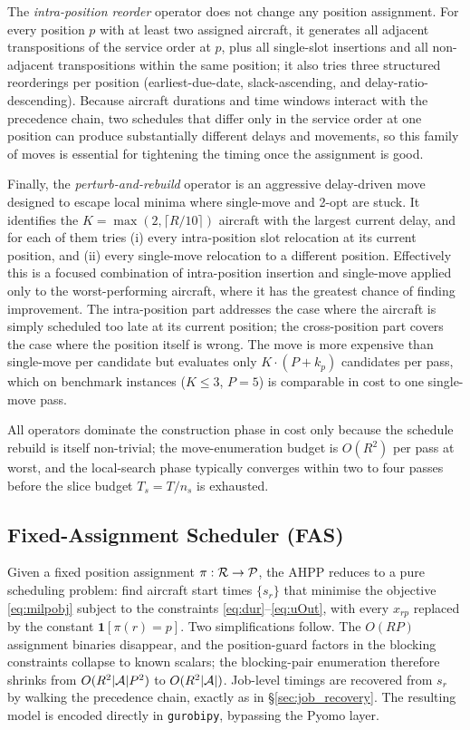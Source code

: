 The \emph{intra-position reorder} operator does not change any
position assignment.  For every position $p$ with at least two
assigned aircraft, it generates all adjacent transpositions of the
service order at $p$, plus all single-slot insertions and all
non-adjacent transpositions within the same position; it also tries
three structured reorderings per position (earliest-due-date,
slack-ascending, and delay-ratio-descending).  Because aircraft
durations and time windows interact with the precedence chain, two
schedules that differ only in the service order at one position
can produce substantially different delays and movements, so this
family of moves is essential for tightening the timing once the
assignment is good.

Finally, the \emph{perturb-and-rebuild} operator is an aggressive
delay-driven move designed to escape local minima where single-move
and 2-opt are stuck.  It identifies the
$K = \max(2, \lceil R/10 \rceil)$ aircraft with the largest current
delay, and for each of them tries (i) every intra-position slot
relocation at its current position, and (ii) every single-move
relocation to a different position.  Effectively this is a focused
combination of intra-position insertion and single-move applied only
to the worst-performing aircraft, where it has the greatest chance of
finding improvement.  The intra-position part addresses the case
where the aircraft is simply scheduled too late at its current
position; the cross-position part covers the case where the position
itself is wrong.  The move is more expensive than single-move per
candidate but evaluates only $K \cdot (P + k_p)$ candidates per pass,
which on benchmark instances ($K \le 3$, $P = 5$) is comparable in
cost to one single-move pass.

All operators dominate the construction phase in cost only because
the schedule rebuild is itself non-trivial; the move-enumeration
budget is $O(R^2)$ per pass at worst, and the local-search phase
typically converges within two to four passes before the slice
budget $T_s = T/n_s$ is exhausted.

\subsection{Fixed-Assignment Scheduler (FAS)}
\label{sec:fas}

Given a fixed position assignment $\pi : \mathcal{R} \to \mathcal{P}$, the AHPP reduces
to a pure scheduling problem: find aircraft start times $\{s_r\}$ that
minimise the objective \eqref{eq:milpobj} subject to the constraints
\eqref{eq:dur}--\eqref{eq:uOut}, with every $x_{rp}$ replaced by the
constant $\mathbf{1}[\pi(r) = p]$.  Two simplifications follow.  The
$O(RP)$ assignment binaries disappear, and the position-guard factors in
the blocking constraints collapse to known scalars; the blocking-pair
enumeration therefore shrinks from $O(R^2 |\mathcal{A}| P^2)$ to
$O(R^2 |\mathcal{A}|)$.  Job-level timings are recovered from $s_r$ by walking
the precedence chain, exactly as in \S\ref{sec:job_recovery}.  The
resulting model is encoded directly in \texttt{gurobipy}, bypassing the
Pyomo layer.

